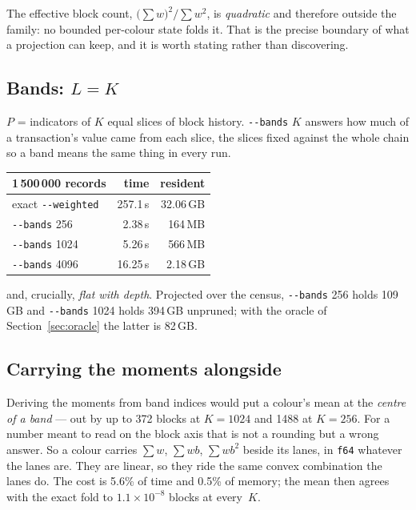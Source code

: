\documentclass[11pt,a4paper]{article}
\newcommand{\flag}[1]{\texttt{-{}-#1}}
\begin{document}
The effective block count, $\big(\sum w\big)^2/\sum w^2$, is \emph{quadratic} and
therefore outside the family: no bounded per-colour state folds it. That is the
precise boundary of what a projection can keep, and it is worth stating rather
than discovering.

\subsection{Bands: $L=K$}

$P$ = indicators of $K$ equal slices of block history. \flag{bands} $K$ answers
how much of a transaction's value came from each slice, the slices fixed against
the whole chain so a band means the same thing in every run.

\begin{center}
\begin{tabular}{lrr}
\toprule
1\,500\,000 records & time & resident \\
\midrule
exact \flag{weighted} & 257.1\,s & 32.06\,GB \\
\flag{bands} 256      & 2.38\,s  & 164\,MB \\
\flag{bands} 1024     & 5.26\,s  & 566\,MB \\
\flag{bands} 4096     & 16.25\,s & 2.18\,GB \\
\bottomrule
\end{tabular}
\end{center}

and, crucially, \emph{flat with depth}. Projected over the census, \flag{bands}
256 holds 109\,GB and \flag{bands} 1024 holds 394\,GB unpruned; with the oracle
of Section~\ref{sec:oracle} the latter is 82\,GB.

\subsection{Carrying the moments alongside}
\label{sec:carry}

Deriving the moments from band indices would put a colour's mean at the
\emph{centre of a band} --- out by up to 372 blocks at $K=1024$ and 1488 at
$K=256$. For a number meant to read on the block axis that is not a rounding but
a wrong answer. So a colour carries $\sum w$, $\sum wb$, $\sum wb^2$ beside its
lanes, in \texttt{f64} whatever the lanes are. They are linear, so they ride the
same convex combination the lanes do. The cost is 5.6\% of time and 0.5\% of
memory; the mean then agrees with the exact fold to $1.1\times10^{-8}$ blocks at
every~$K$.
\end{document}
